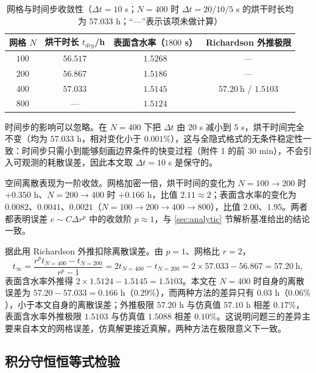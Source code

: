 \documentclass[12pt,a4paper]{article}
\begin{document}
\begin{table}[H]
\centering
\caption{网格与时间步收敛性（$\Delta t=10$ s；$N=400$ 时 $\Delta t=20/10/5$ s 的烘干时长均为 $57.033$ h；“---”表示该项未做计算）}
\label{tab:convergence}
\small
\begin{tabular}{cccc}
\toprule
网格 $N$ & 烘干时长 $t_{dry}$/h & 表面含水率（$1800$ s） & Richardson 外推极限\\
\midrule
$100$ & $56.517$ & $1.5268$ & ---\\
$200$ & $56.867$ & $1.5186$ & ---\\
$400$ & $57.033$ & $1.5145$ & $57.20\ \mathrm{h}$ \;/\; $1.5103$\\
$800$ & --- & $1.5124$ & \\
\bottomrule
\end{tabular}
\end{table}

时间步的影响可以忽略。在 $N=400$ 下把 $\Delta t$ 由 $20$ s 减小到 $5$ s，烘干时间完全不变（均为 $57.033$ h，相对变化小于 $0.001\%$），这与全隐式格式的无条件稳定性一致：时间步只需小到能够刻画边界条件的快变过程（附件 1 的前 $30$ min），不会引入可观测的耗散误差，因此本文取 $\Delta t=10$ s 是保守的。

空间离散表现为一阶收敛。网格加密一倍，烘干时间的变化为 $N{=}100\to200$ 时 $+0.350$ h、$N{=}200\to400$ 时 $+0.166$ h，比值 $2.11\approx2$；表面含水率的变化为 $0.0082$、$0.0041$、$0.0021$（$N{=}100\to200\to400\to800$），比值 $2.00$、$1.95$。两者都表明误差 $e\sim C\Delta r^{p}$ 中的收敛阶 $p\approx1$，与 \ref{sec:analytic} 节解析基准给出的结论一致。

据此用 Richardson 外推扣除离散误差。由 $p=1$、网格比 $r=2$，
\begin{equation}
t_{\infty}=\frac{r^{p}t_{N=400}-t_{N=200}}{r^{p}-1}=2t_{N=400}-t_{N=200}=2\times57.033-56.867=57.20\ \mathrm{h},
\end{equation}
表面含水率外推得 $2\times1.5124-1.5145=1.5103$。本文在 $N=400$ 时自身的离散误差为 $57.20-57.033=0.166$ h（$0.29\%$），而两种方法的差异只有 $0.03$ h（$0.06\%$），小于本文自身的离散误差；外推极限 $57.20$ h 与仿真值 $57.10$ h 相差 $0.17\%$，表面含水率外推极限 $1.5103$ 与仿真值 $1.5088$ 相差 $0.10\%$。这说明问题三的差异主要来自本文的网格误差，仿真解更接近真解，两种方法在极限意义下一致。

\subsection{积分守恒恒等式检验}
\end{document}
